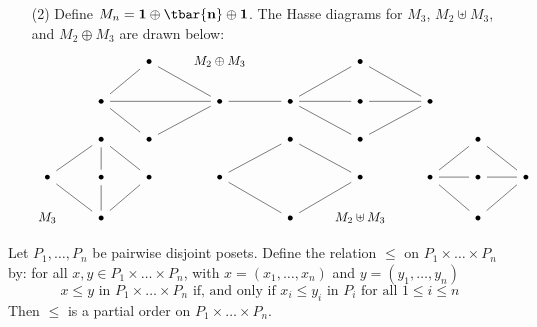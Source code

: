 \begin{example}
\begin{enumerate}
    \item[(2)] Define $M_n=\mathbf{1} \oplus \tbar{\mathbf{n}} \oplus
      \mathbf{1}$. The Hasse diagrams for $M_3$, $M_2 \uplus M_3$, and
      $M_2 \oplus M_3$ are drawn below:
      \[\begin{tikzcd}
        && \bullet & {M_2 \oplus M_3} && \bullet \\
        & \bullet && \bullet & \bullet & \bullet & \bullet \\
        & \bullet & \bullet && \bullet & \bullet && \bullet \\
        \bullet & \bullet & \bullet & \bullet && \bullet & \bullet & \bullet & \bullet \\
        {M_3} & \bullet &&& \bullet & {M_2 \uplus M_3} && \bullet
        \arrow[no head, from=1-3, to=2-2]
        \arrow[no head, from=1-6, to=2-7]
        \arrow[no head, from=2-2, to=2-4]
        \arrow[no head, from=2-2, to=3-3]
        \arrow[no head, from=2-4, to=1-3]
        \arrow[no head, from=2-4, to=2-5]
        \arrow[no head, from=2-5, to=1-6]
        \arrow[no head, from=2-5, to=2-6]
        \arrow[no head, from=2-6, to=2-7]
        \arrow[no head, from=2-7, to=3-6]
        \arrow[no head, from=3-2, to=4-1]
        \arrow[no head, from=3-3, to=2-4]
        \arrow[no head, from=3-5, to=4-4]
        \arrow[no head, from=3-6, to=2-5]
        \arrow[no head, from=3-8, to=4-7]
        \arrow[no head, from=4-1, to=5-2]
        \arrow[no head, from=4-2, to=3-2]
        \arrow[no head, from=4-3, to=3-2]
        \arrow[no head, from=4-4, to=5-5]
        \arrow[no head, from=4-6, to=3-5]
        \arrow[no head, from=4-7, to=4-8]
        \arrow[no head, from=4-7, to=5-8]
        \arrow[no head, from=4-8, to=4-9]
        \arrow[no head, from=4-9, to=3-8]
        \arrow[no head, from=5-2, to=4-2]
        \arrow[no head, from=5-2, to=4-3]
        \arrow[no head, from=5-5, to=4-6]
        \arrow[no head, from=5-8, to=4-9]
      \end{tikzcd}\]
  \end{enumerate}
\end{example}

\begin{proposition}\label{proposition_1.5.4}
  Let $P_1, \dots, P_n$ be pairwise disjoint posets. Define the
  relation $\leq$ on $P_1 \times \dots \times P_n$ by: for all $x,y \in
  P_1 \times \dots \times P_n$, with $x=(x_1, \dots, x_n)$ and
  $y=(y_1, \dots, y_n)$
  \begin{equation*}
    x \leq y \text{ in } P_1 \times \dots \times P_n \text{ if, and only if }
    x_i \leq y_i \text{ in } P_i \text{ for all } 1 \leq i \leq n
  \end{equation*}
  Then $\leq$ is a partial order on  $P_1 \times \dots \times P_n$.
\end{proposition}

